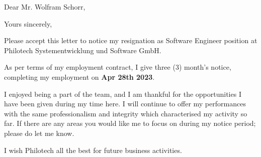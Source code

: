 \documentclass[12pt,a4paper,sans]{moderncv}                                                     %
\begin{document}
\date{Friday, February 03rd, 2023}
\opening{Dear Mr. Wolfram Schorr,}
\closing{Yours sincerely,}
\makelettertitle
\justifying
\vspace{0,5 cm}

Please accept this letter to notice my resignation as Software Engineer position at Philotech Systementwicklung und Software GmbH.

\vspace{0,5 cm}

As per terms of my employment contract, I give three (3) month’s notice, completing my employment on \textbf{Apr 28th 2023}.

\vspace{0,5 cm}

I enjoyed being a part of the team, and I am thankful for the opportunities I have been given during my time here. I will continue to offer my performances with the same professionalism and integrity which characterised my activity so far. If there are any areas you would like me to focus on during my notice period; please do let me know.
\vspace{1 cm}

I wish Philotech all the best for future business activities.

\vspace{1 cm}
\makeletterclosing
\end{document}
